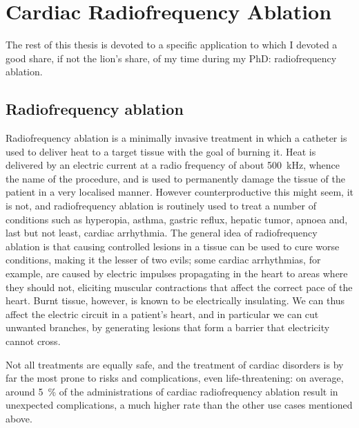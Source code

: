 \chapter{Cardiac Radiofrequency Ablation}
\label{cha_rfa}
The rest of this thesis is devoted to a specific application to which I devoted a good share, if not the lion's share, of my time during my PhD: radiofrequency ablation.

\section{Radiofrequency ablation}
\label{sec_rfa}
Radiofrequency ablation is a minimally invasive treatment in which a catheter is used to deliver heat to a target tissue with the goal of burning it.
Heat is delivered by an electric current at a radio frequency of about \SI{500}{\kHz}, whence the name of the procedure, and is used to permanently damage the tissue of the patient in a very localised manner.
However counterproductive this might seem, it is not, and radiofrequency ablation is routinely used to treat a number of conditions such as hyperopia, asthma, gastric reflux, hepatic tumor, apnoea and, last but not least, cardiac arrhythmia.
The general idea of radiofrequency ablation is that causing controlled lesions in a tissue can be used to cure worse conditions, making it the lesser of two evils; some cardiac arrhythmias, for example, are caused by electric impulses propagating in the heart to areas where they should not, eliciting muscular contractions that affect the correct pace of the heart.
Burnt tissue, however, is known to be electrically insulating.
We can thus affect the electric circuit in a patient's heart, and in particular we can cut unwanted branches, by generating lesions that form a barrier that electricity cannot cross.

Not all treatments are equally safe, and the treatment of cardiac disorders is by far the most prone to risks and complications, even life-threatening: on average, around \SI{5}{\percent} of the administrations of cardiac radiofrequency ablation result in unexpected complications, a much higher rate than the other use cases mentioned above.

